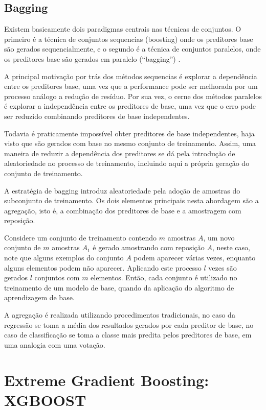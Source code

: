 \subsection{Bagging}

Existem basicamente dois paradigmas centrais nas técnicas de conjuntos. O primeiro é a técnica de conjuntos sequencias (boosting) onde os preditores base são gerados sequencialmente, e o segundo é a técnica de conjuntos paralelos, onde os preditores base são gerados em paralelo (``bagging'') \cite{BREIMAN:1996}.

A principal motivação por trás dos métodos sequencias é explorar a dependência entre os preditores base, uma vez que a performance pode ser melhorada por um processo análogo a redução de resíduo. Por sua vez, o cerne dos métodos paralelos é explorar a independência entre os preditores de base, uma vez que o erro pode ser reduzido combinando preditores de base independentes.

Todavia é praticamente impossível obter preditores de base independentes, haja visto que são gerados com base no mesmo conjunto de treinamento. Assim, uma maneira de reduzir a dependência dos preditores se dá pela introdução de aleatoriedade no processo de treinamento, incluindo aqui a própria geração do conjunto de treinamento.

A estratégia de bagging introduz aleatoriedade pela adoção de amostras do subconjunto de treinamento. Os dois elementos principais nesta abordagem são a agregação, isto é, a combinação dos preditores de base e a amostragem com reposição.

Considere um conjunto de treinamento contendo $m$ amostras $A$, um novo conjunto de $m$ amostras $A_1$ é gerado amostrando com reposição $A$, neste caso, note que alguns exemplos do conjunto $A$ podem aparecer várias vezes, enquanto alguns elementos podem não aparecer. Aplicando este processo $l$ vezes são gerados $l$ conjuntos com $m$ elementos. Então, cada conjunto é utilizado no treinamento de um modelo de base, quando da aplicação do algoritmo de aprendizagem de base.

A agregação é realizada utilizando procedimentos tradicionais, no caso da regressão se toma a média dos resultados gerados por cada preditor de base, no caso de classificação se toma a classe mais predita pelos preditores de base, em uma analogia com uma votação.

\section{Extreme Gradient Boosting: XGBOOST}

